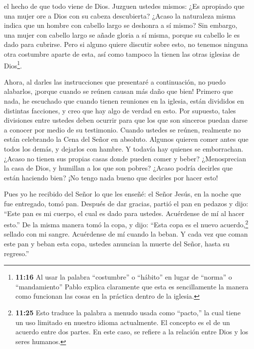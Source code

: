 el hecho de que todo viene de Dios.  Juzguen ustedes
mismos: ¿Es apropiado que una mujer ore a Dios con su cabeza
descubierta?  ¿Acaso la naturaleza misma indica que un
hombre con cabello largo se deshonra a sí mismo?  Sin
embargo, una mujer con cabello largo se añade gloria a sí misma, porque
su cabello le es dado para cubrirse.  Pero si alguno quiere
discutir sobre esto, no tenemos ninguna otra costumbre aparte de esta,
así como tampoco la tienen las otras iglesias de Dios\footnote{\textbf{11:16}
  Al usar la palabra ``costumbre'' o ``hábito'' en lugar de ``norma'' o
  ``mandamiento'' Pablo explica claramente que esta es sencillamente la
  manera como funcionan las cosas en la práctica dentro de la iglesia.}.

 Ahora, al darles las instrucciones que presentaré a
continuación, no puedo alabarlos, ¡porque cuando se reúnen causan más
daño que bien!  Primero que nada, he escuchado que cuando
tienen reuniones en la iglesia, están divididos en distintas facciones,
y creo que hay algo de verdad en esto.  Por supuesto, tales
divisiones entre ustedes deben ocurrir para que los que son sinceros
puedan darse a conocer por medio de su testimonio.  Cuando
ustedes se reúnen, realmente no están celebrando la Cena del Señor en
absoluto.  Algunos quieren comer antes que todos los demás,
y dejarlos con hambre. Y todavía hay quienes se emborrachan.
 ¿Acaso no tienen sus propias casas donde pueden comer y
beber? ¿Menosprecian la casa de Dios, y humillan a los que son pobres?
¿Acaso podría decirles que están haciendo bien? ¡No tengo nada bueno que
decirles por hacer esto!

 Pues yo he recibido del Señor lo que les enseñé: el Señor
Jesús, en la noche que fue entregado, tomó pan.  Después de
dar gracias, partió el pan en pedazos y dijo: ``Este pan es mi cuerpo,
el cual es dado para ustedes. Acuérdense de mí al hacer esto.''
 De la misma manera tomó la copa, y dijo: ``Esta copa es el
nuevo acuerdo,\footnote{\textbf{11:25} Esto traduce la palabra a menudo
  usada como ``pacto,'' la cual tiene un uso limitado en nuestro idioma
  actualmente. El concepto es el de un acuerdo entre dos partes. En este
  caso, se refiere a la relación entre Dios y los seres humanos.}
sellado con mi sangre. Acuérdense de mí cuando la beban.  Y
cada vez que coman este pan y beban esta copa, ustedes anuncian la
muerte del Señor, hasta su regreso.''

